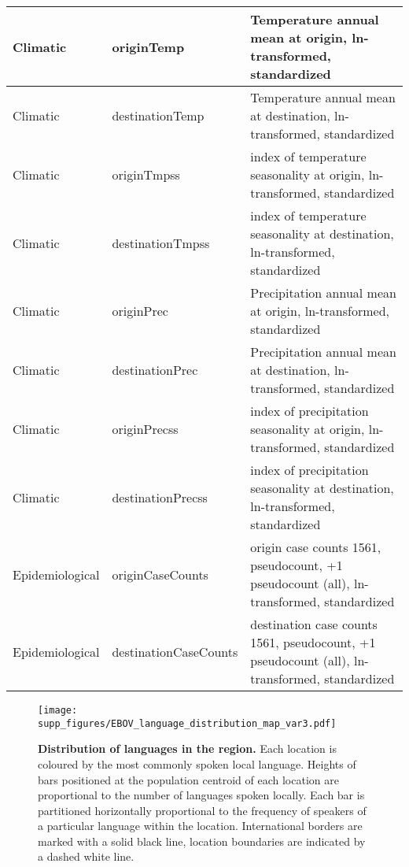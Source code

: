 \documentclass[11pt,oneside,letterpaper]{article}
\begin{document}
\begin{longtable}{ | l | l | p{} | }
\hline
Climatic & originTemp & Temperature annual mean at origin, ln-transformed, standardized \\ 
\hline
Climatic & destinationTemp & Temperature annual mean at destination, ln-transformed, standardized \\ 
\hline
Climatic & originTmpss & index of temperature seasonality at origin, ln-transformed, standardized \\ 
\hline
Climatic & destinationTmpss & index of temperature seasonality at destination, ln-transformed, standardized \\ 
\hline
Climatic & originPrec & Precipitation annual mean at origin, ln-transformed, standardized \\ 
\hline
Climatic & destinationPrec & Precipitation annual mean at destination, ln-transformed, standardized \\ 
\hline
Climatic & originPrecss & index of precipitation seasonality at origin, ln-transformed, standardized \\ 
\hline
Climatic & destinationPrecss & index of precipitation seasonality at destination, ln-transformed, standardized \\ 
\hline
Epidemiological & originCaseCounts & origin case counts 1561, pseudocount, +1 pseudocount (all), ln-transformed, standardized   \\ 
\hline
Epidemiological & destinationCaseCounts & destination case counts 1561, pseudocount, +1 pseudocount (all), ln-transformed, standardized   \\ 
\hline
\end{longtable}

\begin{figure}[H]
 \centering		
	\texttt{[image: supp\_figures/EBOV\_language\_distribution\_map\_var3.pdf]}
	\caption{\textbf{Distribution of languages in the region.}
	Each location is coloured by the most commonly spoken local language.
	Heights of bars positioned at the population centroid of each location are proportional to the number of languages spoken locally.
	Each bar is partitioned horizontally proportional to the frequency of speakers of a particular language within the location.
	International borders are marked with a solid black line, location boundaries are indicated by a dashed white line.
	}
	\label{languages}
\end{figure}
\end{document}
